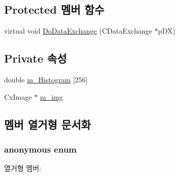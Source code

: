 \subsection*{Protected 멤버 함수}
\begin{DoxyCompactItemize}
\item 
virtual void \hyperlink{class_c_hist_dlg_ad79b371c18c4129610b59608d97ed67f}{Do\-Data\-Exchange} (C\-Data\-Exchange $\ast$p\-D\-X)
\end{DoxyCompactItemize}
\subsection*{Private 속성}
\begin{DoxyCompactItemize}
\item 
double \hyperlink{class_c_hist_dlg_a6c2d395cebef6f871fd1791fa57b6f55}{m\-\_\-\-Histogram} \mbox{[}256\mbox{]}
\item 
Cx\-Image $\ast$ \hyperlink{class_c_hist_dlg_a931451fed18d5abe289575cecc8e9f54}{m\-\_\-img}
\end{DoxyCompactItemize}


\subsection{멤버 열거형 문서화}
\hypertarget{class_c_hist_dlg_ac536fdef65118a44834ace1e795b5d53}{\subsubsection[{anonymous enum}]{\setlength{\rightskip}{0pt plus 5cm}anonymous enum}}\label{class_c_hist_dlg_ac536fdef65118a44834ace1e795b5d53}
\begin{Desc}
\item[열거형 멤버\-: ]\par
\begin{description}
\item[{\em 
\hypertarget{class_c_hist_dlg_ac536fdef65118a44834ace1e795b5d53a6355bda489fa5ea40bdc03fb4ea1baea}{I\-D\-D}\label{class_c_hist_dlg_ac536fdef65118a44834ace1e795b5d53a6355bda489fa5ea40bdc03fb4ea1baea}
}]\end{description}
\end{Desc}



